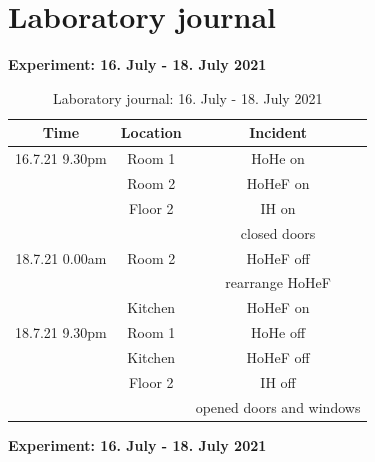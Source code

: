 \section{Laboratory journal}
\label{sec:appendix:Laborbuch}
\textbf{Experiment: 16. July - 18. July 2021}
\begin{table}[H]
    \centering
    \begin{tabular}{c|c|c}
        \textbf{Time} & \textbf{Location} & \textbf{Incident }\\
        \hline
        \hline
        16.7.21 9.30pm & Room 1 & HoHe on\\
        & Room 2 & HoHeF on\\
        & Floor 2 & IH on\\
        && closed doors\\
        \hline
        18.7.21 0.00am & Room 2 & HoHeF off\\ 
        && rearrange HoHeF \\
        & Kitchen & HoHeF on\\
        \hline
        18.7.21 9.30pm & Room 1 & HoHe off\\
        & Kitchen & HoHeF off\\
        & Floor 2 & IH off\\
        && opened doors and windows\\
    \end{tabular}
    \caption{Laboratory journal: 16. July - 18. July 2021}
    \label{tab:Experiment1app}
\end{table}
\newpage
\textbf{Experiment: 16. July - 18. July 2021}
